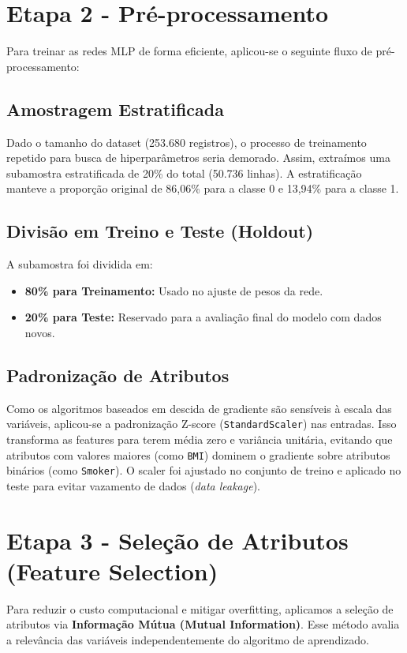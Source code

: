 \documentclass[12pt,a4paper]{article}
\begin{document}
\section{Etapa 2 - Pré-processamento}
Para treinar as redes MLP de forma eficiente, aplicou-se o seguinte fluxo de pré-processamento:

\subsection{Amostragem Estratificada}
Dado o tamanho do dataset (253.680 registros), o processo de treinamento repetido para busca de hiperparâmetros seria demorado. Assim, extraímos uma subamostra estratificada de 20\% do total (50.736 linhas). A estratificação manteve a proporção original de 86,06\% para a classe 0 e 13,94\% para a classe 1.

\subsection{Divisão em Treino e Teste (Holdout)}
A subamostra foi dividida em:
\begin{itemize}
    \item \textbf{80\% para Treinamento:} Usado no ajuste de pesos da rede.
    \item \textbf{20\% para Teste:} Reservado para a avaliação final do modelo com dados novos.
\end{itemize}

\subsection{Padronização de Atributos}
Como os algoritmos baseados em descida de gradiente são sensíveis à escala das variáveis, aplicou-se a padronização Z-score (\texttt{StandardScaler}) nas entradas. Isso transforma as features para terem média zero e variância unitária, evitando que atributos com valores maiores (como \texttt{BMI}) dominem o gradiente sobre atributos binários (como \texttt{Smoker}). O scaler foi ajustado no conjunto de treino e aplicado no teste para evitar vazamento de dados (\textit{data leakage}).

\section{Etapa 3 - Seleção de Atributos (Feature Selection)}
Para reduzir o custo computacional e mitigar overfitting, aplicamos a seleção de atributos via \textbf{Informação Mútua (Mutual Information)}. Esse método avalia a relevância das variáveis independentemente do algoritmo de aprendizado.
\end{document}
